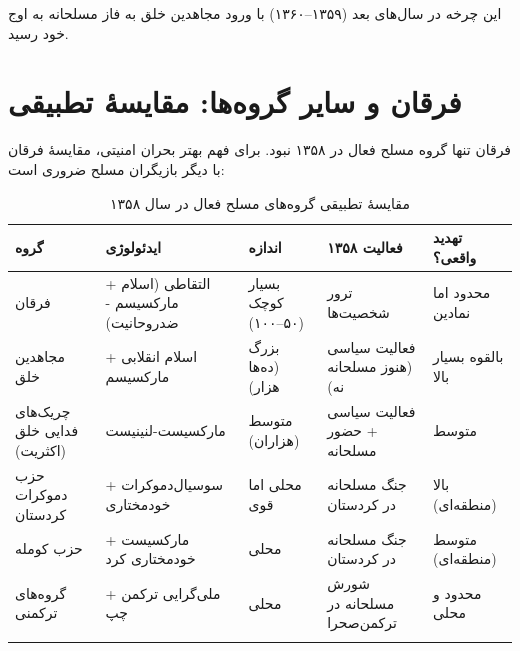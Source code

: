 \documentclass[12pt,a4paper]{book}
\begin{document}
این چرخه در سال‌های بعد (۱۳۵۹–۱۳۶۰) با ورود مجاهدین خلق به فاز مسلحانه به اوج خود رسید.

\section{فرقان و سایر گروه‌ها: مقایسهٔ تطبیقی}

فرقان تنها گروه مسلح فعال در ۱۳۵۸ نبود. برای فهم بهتر بحران امنیتی، مقایسهٔ فرقان با دیگر بازیگران مسلح ضروری است:

\begin{longtable}{%
    >{\raggedleft\arraybackslash}p{}
    >{\raggedleft\arraybackslash}p{}
    >{\raggedleft\arraybackslash}p{}
    >{\raggedleft\arraybackslash}p{}
    >{\raggedleft\arraybackslash}p{}}
\toprule
\rowcolor{cAccent!10}
\textbf{گروه} & \textbf{ایدئولوژی} & \textbf{اندازه} & \textbf{فعالیت ۱۳۵۸} & \textbf{تهدید واقعی؟} \\
\midrule
\endhead

فرقان &
التقاطی (اسلام + مارکسیسم - ضدروحانیت) &
بسیار کوچک (۵۰–۱۰۰) &
ترور شخصیت‌ها &
\textcolor{cWarn}{محدود اما نمادین} \\
\midrule

مجاهدین خلق &
اسلام انقلابی + مارکسیسم &
بزرگ (ده‌ها هزار) &
فعالیت سیاسی (هنوز مسلحانه نه) &
\textcolor{cAccent}{بالقوه بسیار بالا} \\
\midrule

چریک‌های فدایی خلق (اکثریت) &
مارکسیست-لنینیست &
متوسط (هزاران) &
فعالیت سیاسی + حضور مسلحانه &
\textcolor{cWarn}{متوسط} \\
\midrule

حزب دموکرات کردستان &
سوسیال‌دموکرات + خودمختاری &
محلی اما قوی &
جنگ مسلحانه در کردستان &
\textcolor{cAccent}{بالا (منطقه‌ای)} \\
\midrule

حزب کومله &
مارکسیست + خودمختاری کرد &
محلی &
جنگ مسلحانه در کردستان &
\textcolor{cWarn}{متوسط (منطقه‌ای)} \\
\midrule

گروه‌های ترکمنی &
ملی‌گرایی ترکمن + چپ &
محلی &
شورش مسلحانه در ترکمن‌صحرا &
\textcolor{cWarn}{محدود و محلی} \\

\bottomrule
\caption{مقایسهٔ تطبیقی گروه‌های مسلح فعال در سال ۱۳۵۸}
\label{tab:armed-groups}
\end{longtable}
\end{document}
